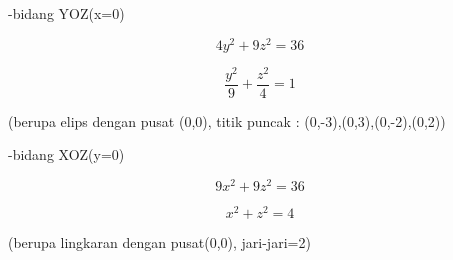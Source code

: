 \documentclass[a4paper,10pt]{article}
\begin{document}
\begin{eulernotebook}
\begin{eulercomment}
\begin{eulercomment}
\begin{eulercomment}
-bidang YOZ(x=0)\\
\end{eulercomment}
\begin{eulerformula}
\[
4y^2+9z^2=36
\]
\end{eulerformula}
\begin{eulerformula}
\[
\frac{y^2}{9}+\frac{z^2}{4}=1
\]
\end{eulerformula}
\begin{eulercomment}
(berupa elips dengan pusat (0,0), titik puncak :
(0,-3),(0,3),(0,-2),(0,2))

-bidang XOZ(y=0)\\
\end{eulercomment}
\begin{eulerformula}
\[
9x^2+9z^2=36
\]
\end{eulerformula}
\begin{eulerformula}
\[
x^2+z^2=4
\]
\end{eulerformula}
\begin{eulercomment}
(berupa lingkaran dengan pusat(0,0), jari-jari=2)


\end{eulercomment}
\end{eulercomment}
\end{eulercomment}
\end{eulernotebook}
\end{document}
